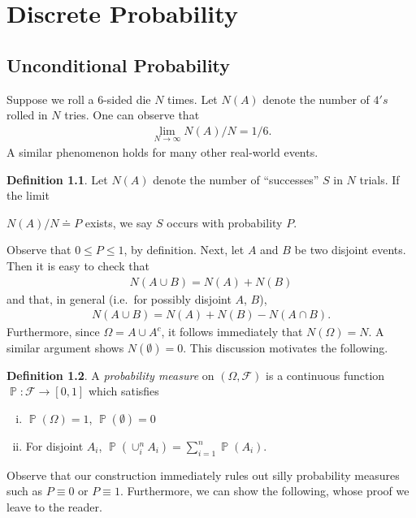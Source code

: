 \documentclass[12pt]{amsbook}
\newcommand{\filter}{\mathcal{F}}
\DeclareMathOperator{\prob}{\mathbb{P}}
\theoremstyle{plain}
\theoremstyle{definition}
\newtheorem*{definition}{Definition}
\theoremstyle{remark}
\numberwithin{equation}{section}  %
\numberwithin{equation}{section}  %
\begin{document}
\chapter{Discrete Probability}
\section{Unconditional Probability}
Suppose we roll a $6$-sided die $N$ times. Let $N(A)$ denote the number of $4's$
rolled in $N$ tries. One can observe that
\begin{align*}
	\lim_{N \to \infty} N(A)/N = 1/6.
\end{align*}
A similar phenomenon holds for many other real-world events.

\begin{definition}
	Let $N(A)$ denote the number of ``successes'' $S$ in $N$ trials. If the
	limit
	
	
 $N(A)/N \doteq P$ exists, we say $S$ occurs with probability $P$.
\end{definition}
Observe that $ 0 \le P \le 1$, by definition.
Next, let $A$ and $B$ be two disjoint events. Then
it is easy to check that
\begin{align*}
	N(A \cup B) = N(A) + N(B)
\end{align*}
and that, in general (i.e.\ for possibly disjoint $A$, $B$),
\begin{align*}
	N(A \cup B) = N(A) + N(B) - N(A \cap B).
\end{align*}
Furthermore, since $\Omega = A \cup A^c$, it follows immediately
that $N(\Omega) = N$. A similar argument shows $N(\emptyset) = 0$.
This discussion motivates the following.
\begin{definition}
	A \emph{probability measure} on $(\Omega, \filter)$ is a continuous function
	$\prob: \filter \to [0,1]$ which satisfies
	\begin{enumerate}[(i)]
		\item
			$\prob(\Omega) = 1$, $\prob(\emptyset) = 0$
		\item
			For disjoint $A_i$, $\prob(\cup_i^n A_i) = \sum_{i = 1}^n 
			\prob(A_i)$.
	\end{enumerate}
\end{definition}
Observe that our construction immediately rules out silly probability
measures such as $P \equiv 0$ or $P \equiv 1$. Furthermore,
we can show the following, whose proof we leave to the reader.
\end{document}
